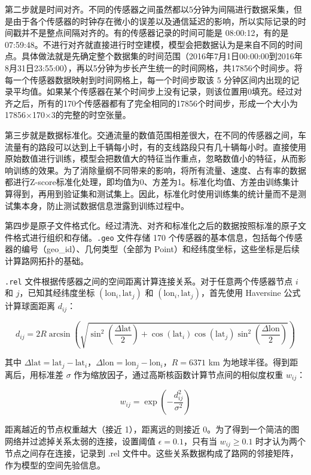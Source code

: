 第二步就是时间对齐。不同的传感器之间虽然都以5分钟为间隔进行数据采集，但是由于各个传感器的时钟存在微小的误差以及通信延迟的影响，所以实际记录的时间戳并不是整点间隔对齐的。有的传感器记录的时间可能是 08:00:12，有的是 07:59:48。不进行对齐就直接进行时空建模，模型会把数据认为是来自不同的时间点。具体做法就是先确定整个数据集的时间范围（2016年7月1日00:00:00到2016年8月31日23:55:00），再以5分钟为步长产生统一的时间网格，共17856个时间步。将每一个传感器数据映射到时间网格上，每一个时间步取该 5 分钟区间内出现的记录平均值。如果某个传感器在某个时间步上没有记录，则该位置用0填充。经过对齐之后，所有的170个传感器都有了完全相同的17856个时间步，形成一个大小为17856×170×3的完整的时空张量。

第三步就是数据标准化。交通流量的数值范围相差很大，在不同的传感器之间，车流量有的路段可以达到上千辆每小时，有的支线路段只有几十辆每小时。直接使用原始数值进行训练，模型会把数值大的特征当作重点，忽略数值小的特征，从而影响训练的效果。为了消除量纲不同带来的影响，将所有流量、速度、占有率的数据都进行Z-score标准化处理，即均值为0、方差为1。标准化均值、方差由训练集计算得到，再用到验证集和测试集上。因此，标准化时使用训练集的统计量而不是测试集本身，防止测试数据信息泄露到训练过程中。

第四步是原子文件格式化。经过清洗、对齐和标准化之后的数据按照标准的原子文件格式进行组织和存储。\texttt{.geo} 文件存储 170 个传感器的基本信息，包括每个传感器的编号（geo\_id）、几何类型（全部为 Point）和经纬度坐标，这些坐标是后续计算路网拓扑的基础。

\texttt{.rel} 文件根据传感器之间的空间距离计算连接关系。对于任意两个传感器节点 $i$ 和 $j$，已知其经纬度坐标 $(\text{lon}_i, \text{lat}_j)$ 和 $(\text{lon}_i, \text{lat}_j)$，首先使用 Haversine 公式计算球面距离 $d_{ij}$：

\begin{equation}
d_{ij} = 2R \arcsin\left(\sqrt{\sin^2\left(\frac{\Delta \text{lat}}{2}\right) + \cos(\text{lat}_i) \cos(\text{lat}_j) \sin^2\left(\frac{\Delta \text{lon}}{2}\right)}\right)
\end{equation}

其中 $\Delta \text{lat} = \text{lat}_j - \text{lat}_i$，$\Delta \text{lon} = \text{lon}_j - \text{lon}_i$，$R = 6371$ km 为地球半径。得到距离后，用标准差 $\sigma$ 作为缩放因子，通过高斯核函数计算节点间的相似度权重 $w_{ij}$：

\begin{equation}
w_{ij} = \exp\left( -\frac{d_{ij}^2}{\sigma^2} \right)
\end{equation}

距离越近的节点权重越大（接近 1），距离远的则接近 0。为了得到一个简洁的图网络并过滤掉关系太弱的连接，设置阈值 $\epsilon = 0.1$，只有当 $w_{ij} \geq 0.1$ 时才认为两个节点之间存在连接，记录到 .rel 文件中。这些关系数据构成了路网的邻接矩阵，作为模型的空间先验信息。

